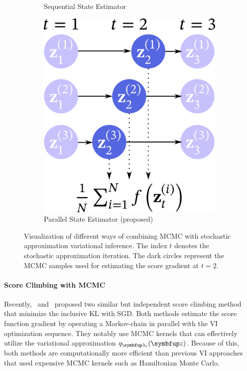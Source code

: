 \begin{figure}
\begin{subfigure}[b]{0.35\textwidth}
        \caption{Sequential State Estimator}\label{fig:seq}
    \end{subfigure}
    \begin{subfigure}[b]{0.3\textwidth}
        \centering
        \includegraphics[scale=0.25]{figures/diagram_3.png}
        \caption{Parallel State Estimator (proposed)}\label{fig:par}
    \end{subfigure}
    \caption{Visualization of different ways of combining MCMC with stochastic approximation variational inference.
    The index \(t\) denotes the stochastic approximation iteration.
    The dark circles represent the MCMC samples used for estimating the score gradient at \(t=2\).
    }\label{fig:overview}
\end{figure}
%

%
\vspace{-0.05in}
\paragraph{Score Climbing with MCMC}
Recently,~\citet{NEURIPS2020_b2070693} and~\citet{pmlr-v124-ou20a} proposed two similar but independent score climbing method that minimize the inclusive KL with SGD.
Both methods estimate the score function gradient by operating a Markov-chain in parallel with the VI optimization sequence.
They notably use MCMC kernels that can effectively utilize the variational approximation \(q_{\vlambda_t}(\vz)\).
Because of this, both methods are computationally more efficient than previous VI approaches~\citep{pmlr-v97-ruiz19a, pmlr-v70-hoffman17a} that used expensive MCMC kernels such as Hamiltonian Monte Carlo.

